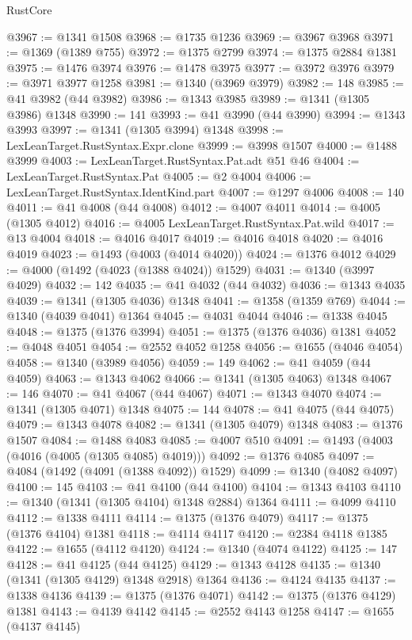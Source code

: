 \begin{lexlean}{RustCore}
\begin{coremodule}
@3967 := @1341 @1508
@3968 := @1735 @1236
@3969 := @3967 @3968
@3971 := @1369 (@1389 @755)
@3972 := @1375 @2799
@3974 := @1375 @2884 @1381
@3975 := @1476 @3974
@3976 := @1478 @3975
@3977 := @3972 @3976
@3979 := @3971 @3977 @1258
@3981 := @1340 (@3969 @3979)
@3982 := 148
@3985 := @41 @3982 (@44 @3982)
@3986 := @1343 @3985
@3989 := @1341 (@1305 @3986) @1348
@3990 := 141
@3993 := @41 @3990 (@44 @3990)
@3994 := @1343 @3993
@3997 := @1341 (@1305 @3994) @1348
@3998 := LexLeanTarget.RustSyntax.Expr.clone
@3999 := @3998 @1507
@4000 := @1488 @3999
@4003 := LexLeanTarget.RustSyntax.Pat.adt @51 @46
@4004 := LexLeanTarget.RustSyntax.Pat
@4005 := @2 @4004
@4006 := LexLeanTarget.RustSyntax.IdentKind.part
@4007 := @1297 @4006
@4008 := 140
@4011 := @41 @4008 (@44 @4008)
@4012 := @4007 @4011
@4014 := @4005 (@1305 @4012)
@4016 := @4005 LexLeanTarget.RustSyntax.Pat.wild
@4017 := @13 @4004
@4018 := @4016 @4017
@4019 := @4016 @4018
@4020 := @4016 @4019
@4023 := @1493 (@4003 (@4014 @4020))
@4024 := @1376 @4012
@4029 := @4000 (@1492 (@4023 (@1388 @4024)) @1529)
@4031 := @1340 (@3997 @4029)
@4032 := 142
@4035 := @41 @4032 (@44 @4032)
@4036 := @1343 @4035
@4039 := @1341 (@1305 @4036) @1348
@4041 := @1358 (@1359 @769)
@4044 := @1340 (@4039 @4041) @1364
@4045 := @4031 @4044
@4046 := @1338 @4045
@4048 := @1375 (@1376 @3994)
@4051 := @1375 (@1376 @4036) @1381
@4052 := @4048 @4051
@4054 := @2552 @4052 @1258
@4056 := @1655 (@4046 @4054)
@4058 := @1340 (@3989 @4056)
@4059 := 149
@4062 := @41 @4059 (@44 @4059)
@4063 := @1343 @4062
@4066 := @1341 (@1305 @4063) @1348
@4067 := 146
@4070 := @41 @4067 (@44 @4067)
@4071 := @1343 @4070
@4074 := @1341 (@1305 @4071) @1348
@4075 := 144
@4078 := @41 @4075 (@44 @4075)
@4079 := @1343 @4078
@4082 := @1341 (@1305 @4079) @1348
@4083 := @1376 @1507
@4084 := @1488 @4083
@4085 := @4007 @510
@4091 := @1493 (@4003 (@4016 (@4005 (@1305 @4085) @4019)))
@4092 := @1376 @4085
@4097 := @4084 (@1492 (@4091 (@1388 @4092)) @1529)
@4099 := @1340 (@4082 @4097)
@4100 := 145
@4103 := @41 @4100 (@44 @4100)
@4104 := @1343 @4103
@4110 := @1340 (@1341 (@1305 @4104) @1348 @2884) @1364
@4111 := @4099 @4110
@4112 := @1338 @4111
@4114 := @1375 (@1376 @4079)
@4117 := @1375 (@1376 @4104) @1381
@4118 := @4114 @4117
@4120 := @2384 @4118 @1385
@4122 := @1655 (@4112 @4120)
@4124 := @1340 (@4074 @4122)
@4125 := 147
@4128 := @41 @4125 (@44 @4125)
@4129 := @1343 @4128
@4135 := @1340 (@1341 (@1305 @4129) @1348 @2918) @1364
@4136 := @4124 @4135
@4137 := @1338 @4136
@4139 := @1375 (@1376 @4071)
@4142 := @1375 (@1376 @4129) @1381
@4143 := @4139 @4142
@4145 := @2552 @4143 @1258
@4147 := @1655 (@4137 @4145)

\end{coremodule}
\end{lexlean}
